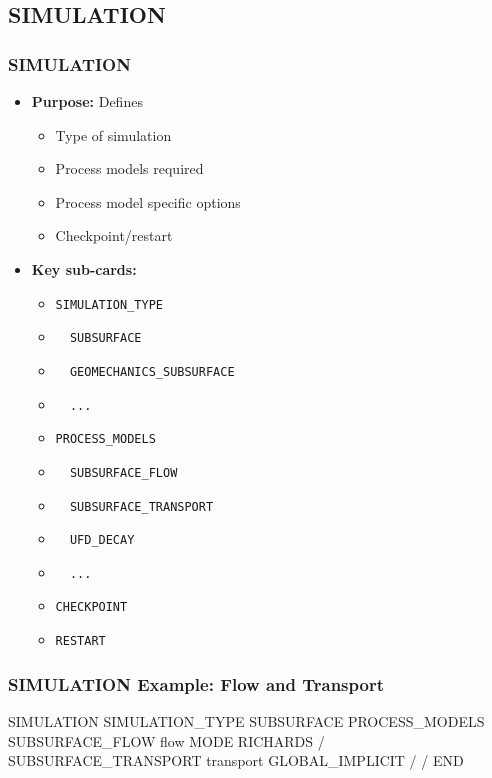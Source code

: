 \subsection{SIMULATION}

\begin{frame}\frametitle{SIMULATION}

\begin{itemize}
\item[] \textbf{Purpose:} Defines 
\begin{itemize}
  \item Type of simulation
  \item Process models required
  \item Process model specific options
  \item Checkpoint/restart
\end{itemize}
\begin{comment}
\item[] \textbf{Example uses:}
\begin{itemize}
  \item 
\end{itemize}
\end{comment}
\item[] \textbf{Key sub-cards:}
\begin{itemize}
\item[] \verb|SIMULATION_TYPE|
\item[] \verb|  SUBSURFACE|
\item[] \verb|  GEOMECHANICS_SUBSURFACE|
\item[] \verb|  ...|
\item[] \verb|PROCESS_MODELS|
\item[] \verb|  SUBSURFACE_FLOW|
\item[] \verb|  SUBSURFACE_TRANSPORT|
\item[] \verb|  UFD_DECAY|
\item[] \verb|  ...|
\item[] \verb|CHECKPOINT|
\item[] \verb|RESTART|
\end{itemize}
\end{itemize}

\end{frame}

\begin{frame}[fragile]\frametitle{SIMULATION Example: Flow and Transport}

\begin{semiverbatim}
SIMULATION
  SIMULATION_TYPE SUBSURFACE
  PROCESS_MODELS
    SUBSURFACE_FLOW flow
      MODE RICHARDS
    /
    SUBSURFACE_TRANSPORT transport
      GLOBAL_IMPLICIT
    /
  /
END
\end{semiverbatim}

\end{frame}

